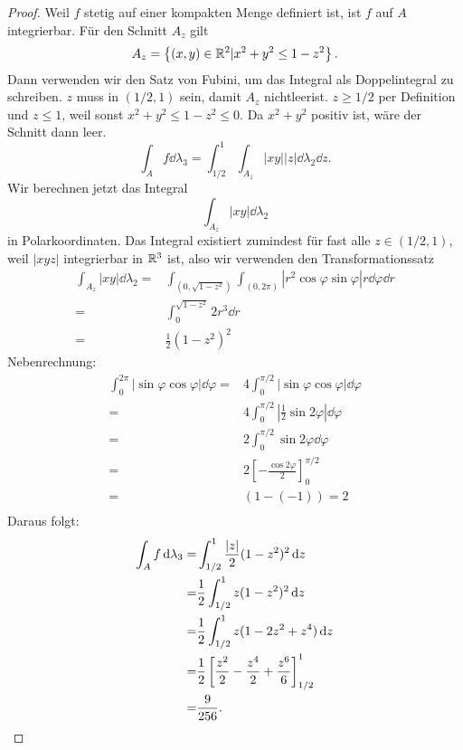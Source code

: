 \begin{proof}
	Weil $f$ stetig auf einer kompakten Menge definiert ist, ist $f$ auf $A$ integrierbar. F\"{u}r den Schnitt $A_z$ gilt
	\[
	A_z=\left\{ (x,y)\in \mathbb{R}^2|x^2+y^2\le 1 - z^2 \right\} 
	.\] 
	Dann verwenden wir den Satz von Fubini, um das Integral als Doppelintegral zu schreiben. $z$ muss in $(1 / 2, 1)$ sein, damit $A_z$ nichtleerist. $z\ge 1 / 2$ per Definition und $z\le 1$, weil sonst $x^2+y^2\le 1 - z^2\le 0$. Da $x^2+y^2$ positiv ist, wäre der Schnitt dann leer.
	\[
		\int_A f\dd{\lambda_3}=\int_{1 / 2}^1\int_{A_z}|xy| |z|\dd{\lambda_2}\dd{z}
	.\] 
	Wir berechnen jetzt das Integral
	\[
		\int_{A_z}|xy|\dd{\lambda_2}
	\]
	in Polarkoordinaten. Das Integral existiert zumindest f\"{u}r fast alle $z\in (1 / 2, 1)$, weil $|xyz|$ integrierbar in $\mathbb{R}^3$ ist, also wir verwenden den Transformationssatz
	\begin{align*}
		\int_{A_z}|x y|\dd{\lambda_2}=&\int_{(0,\sqrt{1-z^2} )}\int_{(0,2\pi)} |r^2\cos\varphi\sin\varphi|r\dd{\varphi}\dd{r}\\
		=&\int_0^{\sqrt{1-z^2} } 2r^3\dd{r}\\
		=&\frac{1}{2}(1-z^2)^2
	\end{align*}
	Nebenrechnung:
	\begin{align*}
		\int_0^{2\pi} |\sin\varphi\cos\varphi|\dd{\varphi}=&4\int_0^{\pi / 2}|\sin\varphi\cos\varphi|\dd{\varphi}\\
		=&4\int_0^{\pi /2}\left| \frac{1}{2}\sin 2\varphi \right| \dd{\varphi}\\
		=&2\int_0^{\pi / 2}\sin 2\varphi\dd{\varphi}\\
		=&2\left[ -\frac{\cos 2\varphi}{2} \right]_0^{\pi / 2}\\
		=&(1 - (-1))=2\\
	\end{align*}
	Daraus folgt:
	\begin{align*}
		\int_A f\dd{\lambda_3}=&\int_{1 / 2}^1 \frac{|z|}{2}(1-z^2)^2\dd{z}\\
		=&\frac{1}{2}\int_{1 / 2}^1 z(1-z^2)^2\dd{z}\\
		=&\frac{1}{2}\int_{1 / 2}^1 z(1-2z^2+z^4)\dd{z}\\
		=&\frac{1}{2}\left[ \frac{z^2}{2}-\frac{z^4}{2}+\frac{z^6}{6} \right]_{1 / 2}^1\\
		=&\frac{9}{256}.\qedhere
	\end{align*}
\end{proof}
